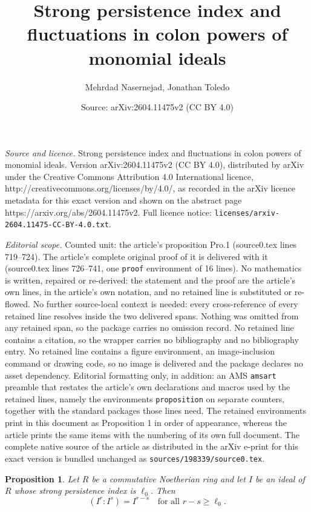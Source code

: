 \documentclass[10pt,a4paper]{amsart}
\title{Strong persistence index and fluctuations in colon powers of monomial ideals}
\author{Mehrdad Nasernejad, Jonathan Toledo}
\date{Source: arXiv:2604.11475v2 (CC BY 4.0)}
\newtheorem{proposition}{Proposition}
\begin{document}
\maketitle

\noindent\emph{Source and licence.} Strong persistence index and fluctuations in colon powers of monomial ideals. Version arXiv:2604.11475v2 (CC BY 4.0), distributed by arXiv under the Creative Commons Attribution 4.0 International licence, http://creativecommons.org/licenses/by/4.0/, as recorded in the arXiv licence metadata for this exact version and shown on the abstract page https://arxiv.org/abs/2604.11475v2. Full licence notice: \texttt{licenses/arxiv-2604.11475-CC-BY-4.0.txt}.\par\smallskip

\noindent\textit{Editorial scope.} Counted unit: the article's proposition Pro.1 (source0.tex lines 719--724). The article's complete original proof of it is delivered with it (source0.tex lines 726--741, one \texttt{proof} environment of 16 lines). No mathematics is written, repaired or re-derived: the statement and the proof are the article's own lines, in the article's own notation, and no retained line is substituted or re-flowed.  No further source-local context is needed: every cross-reference of every retained line resolves inside the two delivered spans.  Nothing was omitted from any retained span, so the package carries no omission record.  No retained line contains a citation, so the wrapper carries no bibliography and no bibliography entry.  No retained line contains a figure environment, an image-inclusion command or drawing code, so no image is delivered and the package declares no asset dependency.  Editorial formatting only, in addition: an AMS \texttt{amsart} preamble that restates the article's own declarations and macros used by the retained lines, namely the environments \texttt{proposition} on separate counters, together with the standard packages those lines need.  The retained environments print in this document as Proposition 1 in order of appearance, whereas the article prints the same items with the numbering of its own full document.  The complete native source of the article as distributed in the arXiv e-print for this exact version is bundled unchanged as \texttt{sources/198339/source0.tex}.
\begin{proposition} \label{Pro.1}
Let $R$ be a commutative Noetherian ring and let $I$ be an ideal of $R$ whose strong persistence index is $\ell_0$. Then
\[
(I^r : I^s) = I^{r-s} \quad \text{for all } r - s \geq \ell_0.
\]
\end{proposition}
\end{document}
